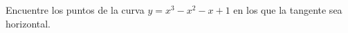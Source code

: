 \item Encuentre los puntos de la curva $y = x^3 - x^2 - x + 1$ en los que la tangente sea horizontal.
